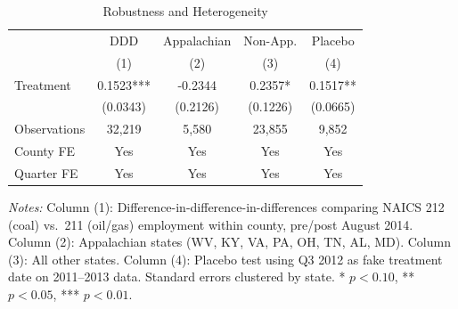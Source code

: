 \begin{table}[htbp]
\centering
\caption{Robustness and Heterogeneity}
\label{tab:robust}
\begin{threeparttable}
\begin{tabular}{lcccc}
\toprule
 & DDD & Appalachian & Non-App. & Placebo \\
 & (1) & (2) & (3) & (4) \\
\midrule
Treatment & 0.1523*** & -0.2344 & 0.2357* & 0.1517** \\
 & (0.0343) & (0.2126) & (0.1226) & (0.0665) \\
\addlinespace
Observations & 32,219 & 5,580 & 23,855 & 9,852 \\
County FE & Yes & Yes & Yes & Yes \\
Quarter FE & Yes & Yes & Yes & Yes \\
\bottomrule
\end{tabular}
\begin{tablenotes}[flushleft]\small
\item \textit{Notes:} Column (1): Difference-in-difference-in-differences comparing NAICS 212 (coal) vs.\ 211 (oil/gas) employment within county, pre/post August 2014. Column (2): Appalachian states (WV, KY, VA, PA, OH, TN, AL, MD). Column (3): All other states. Column (4): Placebo test using Q3 2012 as fake treatment date on 2011--2013 data. Standard errors clustered by state. * $p<0.10$, ** $p<0.05$, *** $p<0.01$.
\end{tablenotes}
\end{threeparttable}
\end{table}

